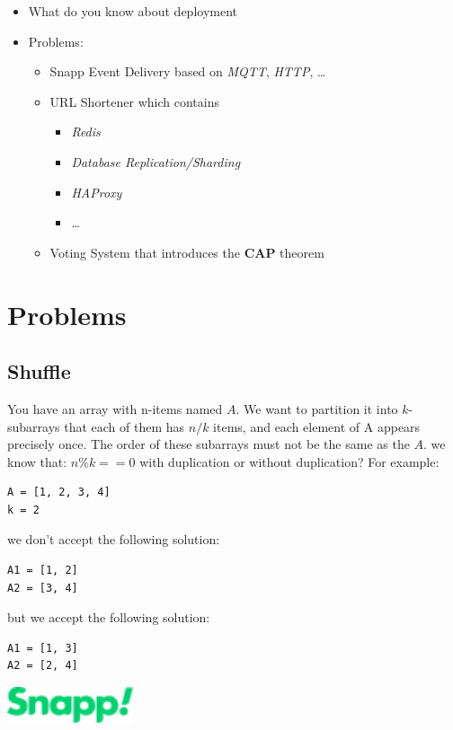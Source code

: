 \documentclass[]{article}
\begin{document}
\begin{multicols}{2}
\begin{itemize}
  \item What do you know about deployment
  \item Problems:
  \begin{itemize}
    \item Snapp Event Delivery based on \textit{MQTT}, \textit{HTTP}, \ldots
    \item URL Shortener which contains
    \begin{itemize}
      \item \textit{Redis}
      \item \textit{Database Replication/Sharding}
      \item \textit{HAProxy}
      \item \ldots
    \end{itemize}
    \item Voting System that introduces the \textbf{CAP} theorem
  \end{itemize}
\end{itemize}

\end{multicols}

\section{Problems}

\subsection{Shuffle}

You have an array with n-items named $A$.
We want to partition it into $k$-subarrays that each of them has $n/k$ items, and each element of A appears precisely once.
The order of these subarrays must not be the same as the $A$.
we know that: $n \% k == 0$
with duplication or without duplication?
For example:

\begin{verbatim}
A = [1, 2, 3, 4]
k = 2
\end{verbatim}

we don't accept the following solution:

\begin{verbatim}
A1 = [1, 2]
A2 = [3, 4]
\end{verbatim}

but we accept the following solution:

\begin{verbatim}
A1 = [1, 3]
A2 = [2, 4]
\end{verbatim}

\vspace{\fill}
\includegraphics[width=10em]{./snapp.png}
\end{document}

